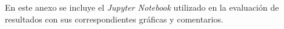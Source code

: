 En este anexo se incluye el \textit{Jupyter Notebook} utilizado en la evaluación de resultados con sus correspondientes gráficas y comentarios.

\newpage
